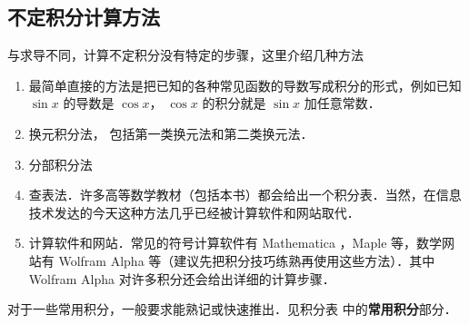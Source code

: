 \subsection{不定积分计算方法}
与求导不同，计算不定积分没有特定的步骤，这里介绍几种方法
\begin{enumerate}
\item 最简单直接的方法是把已知的各种常见函数的导数写成积分的形式，例如已知 $\sin x$ 的导数是 $\cos x$， $\cos x$ 的积分就是 $\sin x$ 加任意常数．
\item 换元积分法， 包括第一类换元法和第二类换元法．

\item 分部积分法

\item 查表法．许多高等数学教材（包括本书）都会给出一个积分表．当然，在信息技术发达的今天这种方法几乎已经被计算软件和网站取代．

\item 计算软件和网站．常见的符号计算软件有 Mathematica %
，Maple 等，数学网站有 Wolfram Alpha %
等（建议先把积分技巧练熟再使用这些方法）．其中 Wolfram Alpha 对许多积分还会给出详细的计算步骤．
 \end{enumerate}

对于一些常用积分，一般要求能熟记或快速推出．见积分表 中的\textbf{常用积分}部分．%




